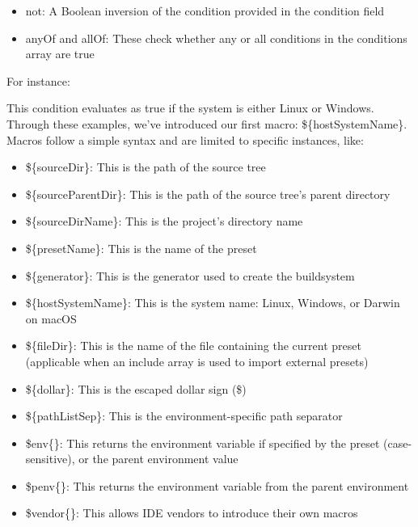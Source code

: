 \begin{itemize}
\item
not: A Boolean inversion of the condition provided in the condition field

\item
anyOf and allOf: These check whether any or all conditions in the conditions array are true
\end{itemize}

For instance:


This condition evaluates as true if the system is either Linux or Windows.
Through these examples, we’ve introduced our first macro: \$\{hostSystemName\}. Macros follow a simple syntax and are limited to specific instances, like:

\begin{itemize}
\item
\$\{sourceDir\}: This is the path of the source tree

\item
\$\{sourceParentDir\}: This is the path of the source tree’s parent directory

\item
\$\{sourceDirName\}: This is the project’s directory name

\item
\$\{presetName\}: This is the name of the preset

\item
\$\{generator\}: This is the generator used to create the buildsystem

\item
\$\{hostSystemName\}: This is the system name: Linux, Windows, or Darwin on macOS

\item
\$\{fileDir\}: This is the name of the file containing the current preset (applicable when an include array is used to import external presets)

\item
\$\{dollar\}: This is the escaped dollar sign (\$)

\item
\$\{pathListSep\}: This is the environment-specific path separator

\item
\$env\{<variable-name>\}: This returns the environment variable if specified by the preset (case-sensitive), or the parent environment value

\item
\$penv\{<variable-name>\}: This returns the environment variable from the parent environment

\item
\$vendor\{<macro-name>\}: This allows IDE vendors to introduce their own macros
\end{itemize}

